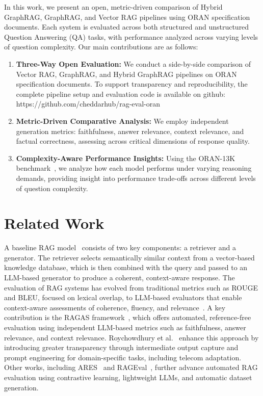 \documentclass[10pt, conference]{IEEEtran}
\begin{document}
In this work, we present an open, metric-driven comparison of Hybrid GraphRAG, GraphRAG, and Vector RAG pipelines using ORAN specification documents. Each system is evaluated across both structured and unstructured Question Answering (QA) tasks, with performance analyzed across varying levels of question complexity. Our main contributions are as follows:
\begin{enumerate} \item \textbf{Three-Way Open Evaluation:} We conduct a side-by-side comparison of Vector RAG, GraphRAG, and Hybrid GraphRAG pipelines on ORAN specification documents. To support transparency and reproducibility, the complete pipeline setup and evaluation code is available on github: https://github.com/cheddarhub/rag-eval-oran

\item \textbf{Metric-Driven Comparative Analysis:} We employ independent generation metrics: faithfulness, answer relevance, context relevance, and factual correctness, assessing across critical dimensions of response quality. 

\item \textbf{Complexity-Aware Performance Insights:} Using the ORAN-13K benchmark~\cite{gajjar2024oran}, we analyze how each model performs under varying reasoning demands, providing insight into performance trade-offs across different levels of question complexity.\end{enumerate}

\section{Related Work}
A baseline RAG model~\cite{lewis2020retrieval} consists of two key components: a retriever and a generator. The retriever selects semantically similar context from a vector-based knowledge database, which is then combined with the query and passed to an LLM-based generator to produce a coherent, context-aware response. The evaluation of RAG systems has evolved from traditional metrics such as ROUGE and BLEU, focused on lexical overlap, to LLM-based evaluators that enable context-aware assessments of coherence, fluency, and relevance~\cite{yu2024evaluation}. A key contribution is the RAGAS framework~\cite{es2024ragas}, which offers automated, reference-free evaluation using independent LLM-based metrics such as faithfulness, answer relevance, and context relevance. Roychowdhury et al.~\cite{roychowdhury2024evaluation} enhance this approach by introducing greater transparency through intermediate output capture and prompt engineering for domain-specific tasks, including telecom adaptation. Other works, including ARES~\cite{saad2023ares} and RAGEval~\cite{zhu2024rageval}, further advance automated RAG evaluation using contrastive learning, lightweight LLMs, and automatic dataset generation.
\end{document}
